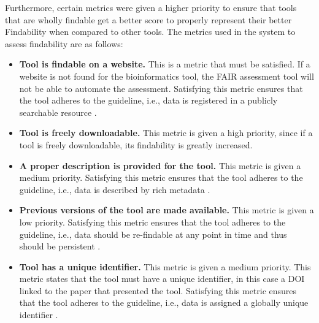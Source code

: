 \documentclass{cisfyp}
\begin{document}
Furthermore, certain metrics were given a higher priority to ensure that tools that are wholly findable get a better score to properly represent their better Findability when compared to other tools.\newline
The metrics used in the system to assess findability are as follows:
\begin{itemize}
	\item \textbf{Tool is findable on a website.}\newline
	This is a metric that must be satisfied. If a website is not found for the bioinformatics tool, the FAIR assessment tool will not be able to automate the assessment. Satisfying this metric ensures that the tool adheres to the guideline, i.e., data is registered in a publicly searchable resource \cite{Wilkinson2016}.
	
	\item \textbf{Tool is freely downloadable.}\newline
	This metric is given a high priority, since if a tool is freely downloadable, its findability is greatly increased. 
	
	\item \textbf{A proper description is provided for the tool.}\newline
	This metric is given a medium priority. Satisfying this metric ensures that the tool adheres to the guideline, i.e., data is described by rich metadata \cite{Wilkinson2016}.
	
	\item \textbf{Previous versions of the tool are made available.}\newline
	This metric is given a low priority. Satisfying this metric ensures that the tool adheres to the guideline, i.e., data should be re-findable at any point in time and thus should be persistent \cite{Wilkinson2016}.
	
	\item \textbf{Tool has a unique identifier.}\newline
	This metric is given a medium priority. This metric states that the tool must have a unique identifier, in this case a DOI linked to the paper that presented the tool. Satisfying this metric ensures that the tool adheres to the guideline, i.e., data is assigned a globally unique identifier \cite{Wilkinson2016}.
	
\end{itemize}
\end{document}
